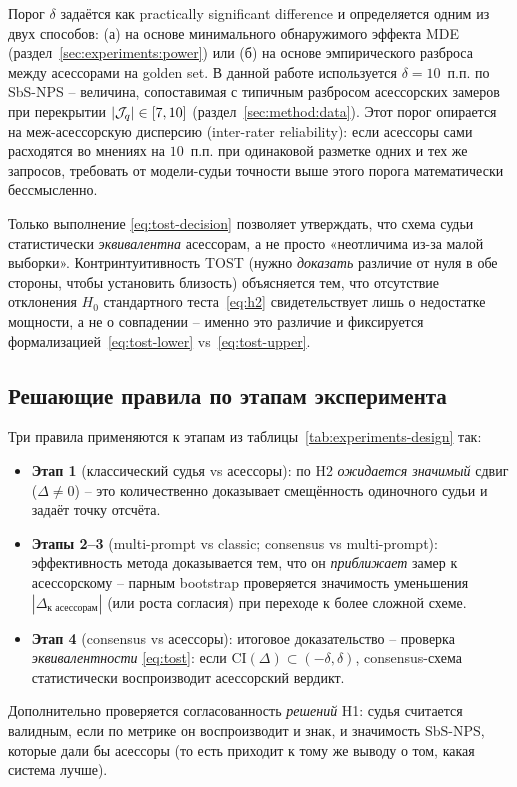 Порог $\delta$ задаётся как practically significant difference и
определяется одним из двух способов: (а) на основе минимального
обнаружимого эффекта MDE (раздел~\ref{sec:experiments:power}) или
(б) на основе эмпирического разброса между асессорами на golden set.
В данной работе используется $\delta = 10$~п.п. по SbS-NPS --
величина, сопоставимая с типичным разбросом асессорских замеров
при перекрытии $|\mathcal{J}_q| \in [7, 10]$
(раздел~\ref{sec:method:data}).
Этот порог опирается на меж-асессорскую дисперсию (inter-rater reliability): если асессоры сами расходятся во мнениях на $10$~п.п. при одинаковой разметке одних и тех же запросов, требовать от модели-судьи точности выше этого порога математически бессмысленно.

Только выполнение \eqref{eq:tost-decision} позволяет утверждать, что
схема судьи статистически \emph{эквивалентна} асессорам, а не просто
«неотличима из-за малой выборки».
Контринтуитивность TOST (нужно \emph{доказать} различие от нуля в
обе стороны, чтобы установить близость) объясняется тем, что
отсутствие отклонения $H_0$ стандартного теста~\eqref{eq:h2}
свидетельствует лишь о недостатке мощности, а не о совпадении --
именно это различие и фиксируется формализацией~\eqref{eq:tost-lower}
vs~\eqref{eq:tost-upper}.

\subsection{Решающие правила по этапам эксперимента}
\label{sec:method:bootstrap:rules}

Три правила применяются к этапам из таблицы~\ref{tab:experiments-design}
так:
\begin{itemize}
    \item \textbf{Этап 1} (классический судья vs асессоры): по H2
        \emph{ожидается значимый} сдвиг ($\Delta \neq 0$) -- это
        количественно доказывает смещённость одиночного судьи и задаёт
        точку отсчёта.
    \item \textbf{Этапы 2--3} (multi-prompt vs classic; consensus vs
        multi-prompt): эффективность метода доказывается тем, что он
        \emph{приближает} замер к асессорскому -- парным bootstrap
        проверяется значимость уменьшения $|\Delta_{\text{к асессорам}}|$
        (или роста согласия) при переходе к более сложной схеме.
    \item \textbf{Этап 4} (consensus vs асессоры): итоговое доказательство
        -- проверка \emph{эквивалентности} \eqref{eq:tost}: если
        $\mathrm{CI}(\Delta) \subset (-\delta, \delta)$, consensus-схема
        статистически воспроизводит асессорский вердикт.
\end{itemize}
Дополнительно проверяется согласованность \emph{решений} H1: судья
считается валидным, если по метрике он воспроизводит и знак, и значимость
$\mathrm{SbS\text{-}NPS}$, которые дали бы асессоры (то есть приходит к
тому же выводу о том, какая система лучше).


